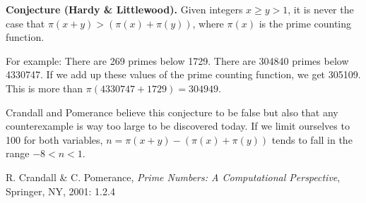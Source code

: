\documentclass[12pt]{article}
\begin{document}
{\bf Conjecture (Hardy \& Littlewood).} Given integers $x \ge y > 1$, it is never the case that $\pi(x + y) > (\pi(x) + \pi(y))$, where $\pi(x)$ is the prime counting function.

For example: There are 269 primes below 1729. There are 304840 primes below 4330747. If we add up these values of the prime counting function, we get 305109. This is more than $\pi(4330747 + 1729) = 304949$.

Crandall and Pomerance believe this conjecture to be false but also that any counterexample is way too large to be discovered today. If we limit ourselves to 100 for both variables, $n = \pi(x + y) - (\pi(x) + \pi(y))$ tends to fall in the range $-8 < n < 1$.

\begin{thebibliography}{1}
 R. Crandall \& C. Pomerance, {\it Prime Numbers: A Computational Perspective}, Springer, NY, 2001: 1.2.4
\end{thebibliography}
\end{document}
